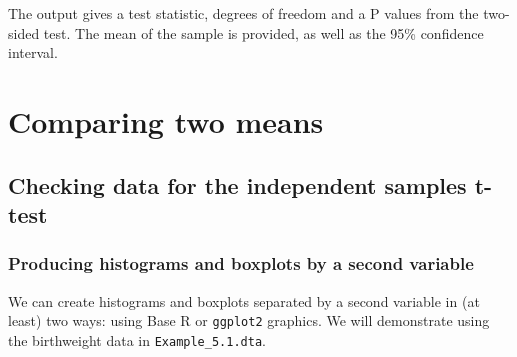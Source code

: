\documentclass[
]{memoir}
\newenvironment{Shaded}{\begin{snugshade}}{\end{snugshade}}
\newcommand{\CommentTok}[1]{\textcolor[rgb]{0.56,0.35,0.01}{\textit{#1}}}
\newcommand{\FunctionTok}[1]{\textcolor[rgb]{0.00,0.00,0.00}{#1}}
\newcommand{\NormalTok}[1]{#1}
\newcommand{\OtherTok}[1]{\textcolor[rgb]{0.56,0.35,0.01}{#1}}
\newcommand{\SpecialCharTok}[1]{\textcolor[rgb]{0.00,0.00,0.00}{#1}}
\newcommand{\StringTok}[1]{\textcolor[rgb]{0.31,0.60,0.02}{#1}}
\begin{document}
The output gives a test statistic, degrees of freedom and a P values from the two-sided test. The mean of the sample is provided, as well as the 95\% confidence interval.

\hypertarget{comparing-two-means}{%
\chapter{Comparing two means}\label{comparing-two-means}}

\hypertarget{checking-data-for-the-independent-samples-t-test}{%
\section{Checking data for the independent samples t-test}\label{checking-data-for-the-independent-samples-t-test}}

\hypertarget{producing-histograms-and-boxplots-by-a-second-variable}{%
\subsection{Producing histograms and boxplots by a second variable}\label{producing-histograms-and-boxplots-by-a-second-variable}}

We can create histograms and boxplots separated by a second variable in (at least) two ways: using Base R or \texttt{ggplot2} graphics. We will demonstrate using the birthweight data in \texttt{Example\_5.1.dta}.

\begin{Shaded}
\end{Shaded}
\end{document}
